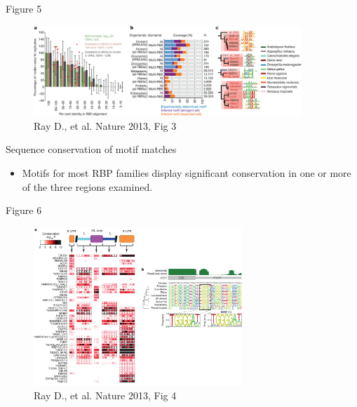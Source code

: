 \documentclass[professionalfont, 12pt, default]{beamer}
\providecommand{\tightlist}{%
    \setlength{\itemsep}{0pt}\setlength{\parskip}{0pt}}
\begin{document}
\begin{frame}{Figure 5}

\begin{figure}
\centering
\includegraphics[width=0.90000\textwidth]{img/f3.jpg}
\caption{Ray D., et al. Nature 2013, Fig 3}
\end{figure}

\end{frame}

\begin{frame}{Sequence conservation of motif matches}

\begin{itemize}
\tightlist
\item
  Motifs for most RBP families display significant conservation in one
  or more of the three regions examined.
\end{itemize}

\end{frame}

\begin{frame}{Figure 6}

\begin{figure}
\centering
\includegraphics[width=0.70000\textwidth]{img/f4.jpg}
\caption{Ray D., et al. Nature 2013, Fig 4}
\end{figure}

\end{frame}
\end{document}
